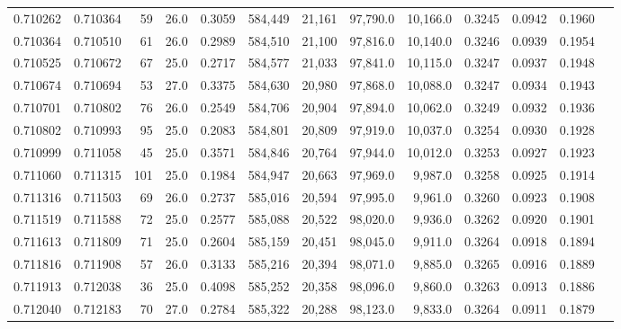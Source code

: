 \begin{tabular}{rrrrrrrrrrrrr}
0.710262 & 0.710364 &    59 & 26.0 &                                     0.3059 & 584,449 &  21,161 &  97,790.0 &  10,166.0 & 0.3245 & 0.0942 & 0.1960 \\
0.710364 & 0.710510 &    61 & 26.0 &                                     0.2989 & 584,510 &  21,100 &  97,816.0 &  10,140.0 & 0.3246 & 0.0939 & 0.1954 \\
0.710525 & 0.710672 &    67 & 25.0 &                                     0.2717 & 584,577 &  21,033 &  97,841.0 &  10,115.0 & 0.3247 & 0.0937 & 0.1948 \\
0.710674 & 0.710694 &    53 & 27.0 &                                     0.3375 & 584,630 &  20,980 &  97,868.0 &  10,088.0 & 0.3247 & 0.0934 & 0.1943 \\
0.710701 & 0.710802 &    76 & 26.0 &                                     0.2549 & 584,706 &  20,904 &  97,894.0 &  10,062.0 & 0.3249 & 0.0932 & 0.1936 \\
0.710802 & 0.710993 &    95 & 25.0 &                                     0.2083 & 584,801 &  20,809 &  97,919.0 &  10,037.0 & 0.3254 & 0.0930 & 0.1928 \\
0.710999 & 0.711058 &    45 & 25.0 &                                     0.3571 & 584,846 &  20,764 &  97,944.0 &  10,012.0 & 0.3253 & 0.0927 & 0.1923 \\
0.711060 & 0.711315 &   101 & 25.0 &                                     0.1984 & 584,947 &  20,663 &  97,969.0 &   9,987.0 & 0.3258 & 0.0925 & 0.1914 \\
0.711316 & 0.711503 &    69 & 26.0 &                                     0.2737 & 585,016 &  20,594 &  97,995.0 &   9,961.0 & 0.3260 & 0.0923 & 0.1908 \\
0.711519 & 0.711588 &    72 & 25.0 &                                     0.2577 & 585,088 &  20,522 &  98,020.0 &   9,936.0 & 0.3262 & 0.0920 & 0.1901 \\
0.711613 & 0.711809 &    71 & 25.0 &                                     0.2604 & 585,159 &  20,451 &  98,045.0 &   9,911.0 & 0.3264 & 0.0918 & 0.1894 \\
0.711816 & 0.711908 &    57 & 26.0 &                                     0.3133 & 585,216 &  20,394 &  98,071.0 &   9,885.0 & 0.3265 & 0.0916 & 0.1889 \\
0.711913 & 0.712038 &    36 & 25.0 &                                     0.4098 & 585,252 &  20,358 &  98,096.0 &   9,860.0 & 0.3263 & 0.0913 & 0.1886 \\
0.712040 & 0.712183 &    70 & 27.0 &                                     0.2784 & 585,322 &  20,288 &  98,123.0 &   9,833.0 & 0.3264 & 0.0911 & 0.1879 \\

\end{tabular}
